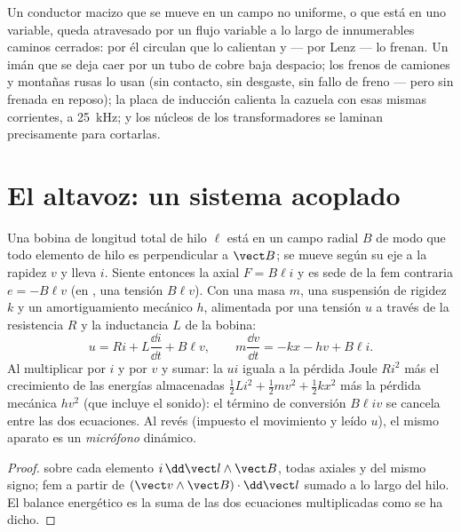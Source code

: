 \begin{example}\label{ex:b1:induction:eddy}
Un conductor macizo que se mueve en un campo no uniforme, o que está en
uno variable, queda atravesado por un flujo variable a lo largo de
innumerables caminos cerrados: por él circulan \emph{} que lo calientan y --- por Lenz --- lo frenan. Un imán que se
deja caer por un tubo de cobre baja despacio; los frenos de camiones y
montañas rusas lo usan (sin contacto, sin desgaste, sin fallo de freno
--- pero sin frenada en reposo); la placa de inducción calienta la cazuela
con esas mismas corrientes, a \qty{25}{kHz}; y los núcleos de los
transformadores se laminan precisamente para cortarlas.
\end{example}

\section{El altavoz: un sistema acoplado}

\begin{proposition}\label{prop:b1:induction:loudspeaker}
Una bobina de longitud total de hilo $\ell$ está en un campo radial $B$
de modo que todo elemento de hilo es perpendicular a $\vect B$; se mueve
según su eje a la rapidez $v$ y lleva $i$. Siente entonces la  axial $F = B\ell i$ y es sede de la fem contraria $e = -B\ell v$
(en , una tensión $B\ell v$). Con una masa $m$, una
suspensión de rigidez $k$ y un amortiguamiento mecánico $h$, alimentada
por una tensión $u$ a través de la resistencia $R$ y la inductancia $L$
de la bobina:
\[
u = Ri + L\frac{\dd i}{\dd t} + B\ell v , \qquad
m\frac{\dd v}{\dd t} = -kx - hv + B\ell i .
\]
Al multiplicar por $i$ y por $v$ y sumar: la  $ui$
iguala a la pérdida Joule $Ri^2$ más el crecimiento de las energías
almacenadas $\tfrac12Li^2 + \tfrac12mv^2 + \tfrac12kx^2$ más la pérdida
mecánica $hv^2$ (que incluye el sonido): el término de conversión
$B\ell iv$ se cancela entre las dos ecuaciones. Al revés (impuesto el
movimiento y leído $u$), el mismo aparato es un \emph{micrófono} dinámico.
\end{proposition}

\begin{proof}
 sobre cada elemento $i\,\dd\vect l\wedge\vect B$, todas
axiales y del mismo signo; fem a partir de
$(\vect v\wedge\vect B)\cdot\dd\vect l$ sumado a lo largo del hilo. El
balance energético es la suma de las dos ecuaciones multiplicadas como se
ha dicho.
\end{proof}

